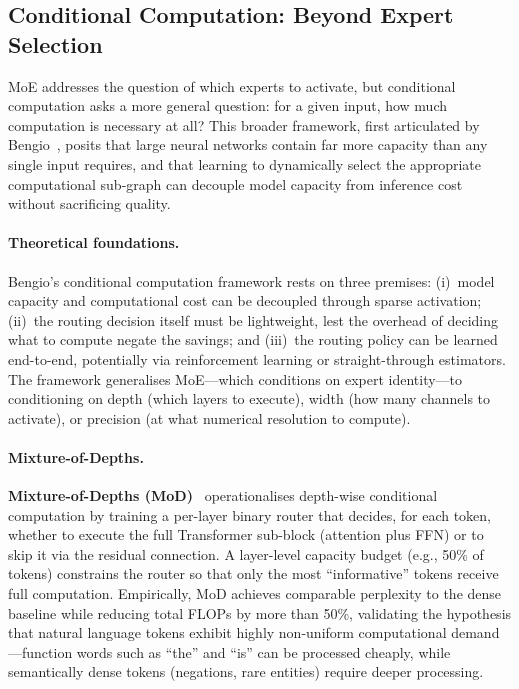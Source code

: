 \subsection{Conditional Computation: Beyond Expert Selection}
\label{subsec:conditional_computation}

MoE addresses the question of which experts to activate, but conditional computation asks a more general question: for a given input, how much computation is necessary at all?
This broader framework, first articulated by Bengio~\cite{bengio2013estimating}, posits that large neural networks contain far more capacity than any single input requires, and that learning to dynamically select the appropriate computational sub-graph can decouple model capacity from inference cost without sacrificing quality.

\paragraph{Theoretical foundations.}
Bengio's conditional computation framework rests on three premises: (i)~model capacity and computational cost can be decoupled through sparse activation; (ii)~the routing decision itself must be lightweight, lest the overhead of deciding what to compute negate the savings; and (iii)~the routing policy can be learned end-to-end, potentially via reinforcement learning or straight-through estimators.
The framework generalises MoE---which conditions on expert identity---to conditioning on depth (which layers to execute), width (how many channels to activate), or precision (at what numerical resolution to compute).

\paragraph{Mixture-of-Depths.}
\textbf{Mixture-of-Depths (MoD)}~\cite{raposo2024mixture} operationalises depth-wise conditional computation by training a per-layer binary router that decides, for each token, whether to execute the full Transformer sub-block (attention plus FFN) or to skip it via the residual connection.
A layer-level capacity budget (e.g., 50\% of tokens) constrains the router so that only the most ``informative'' tokens receive full computation.
Empirically, MoD achieves comparable perplexity to the dense baseline while reducing total FLOPs by more than 50\%, validating the hypothesis that natural language tokens exhibit highly non-uniform computational demand---function words such as ``the'' and ``is'' can be processed cheaply, while semantically dense tokens (negations, rare entities) require deeper processing.

